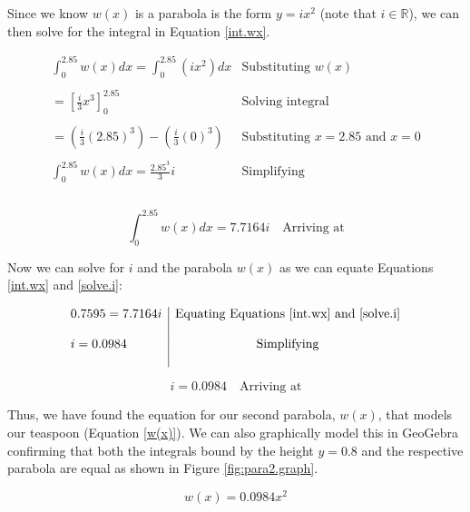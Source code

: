 \documentclass[12pt]{article}
\begin{document}
Since we know $w(x)$ is a parabola is the form $y=ix^2$ (note that $i \in \mathbb{R}$), we can then solve for the integral in Equation \ref{int.wx}.

$$
\begin{array}{l|c}
    \int_0^{2.85}{w(x)}dx = \int_0^{2.85}{(ix^2)}dx & \text{Substituting } w(x) \\ \\
    = \left[   \frac{i}{3}x^3   \right]_0^{2.85} & \text{Solving integral} \\ \\
    = (\frac{i}{3}(2.85)^3) - (\frac{i}{3}(0)^3) & \text{Substituting } x=2.85 \text{ and } x=0 \\ \\
    \int_0^{2.85}{w(x)}dx = \frac{2.85^3}{3}i & \text{Simplifying} \\ \\
 \end{array}
$$

\begin{equation}\label{solve.i}
    \boxed{\int_0^{2.85}{w(x)}dx = 7.7164i}  \quad \text{Arriving at}
\end{equation}

Now we can solve for $i$ and the parabola $w(x)$ as we can equate Equations \ref{int.wx} and \ref{solve.i}:

$$
\begin{array}{l|c}
    0.7595 = 7.7164i & \text{Equating Equations \ref{int.wx} and \ref{solve.i}} \\ \\
    i = 0.0984 & \text{Simplifying} \\ \\
 \end{array}
$$

\begin{equation}\label{solve.i2}
    \boxed{i = 0.0984}  \quad \text{Arriving at}
\end{equation}

Thus, we have found the equation for our second parabola, $w(x)$, that models our teaspoon (Equation \ref{w(x)}). We can also graphically model this in GeoGebra confirming that both the integrals bound by the height $y=0.8$ and the respective parabola are equal as shown in Figure \ref{fig:para2.graph}.

\vspace{-8mm}

\begin{equation}\label{w(x)}
    \boxed{w(x) = 0.0984x^2}
\end{equation}
\end{document}
